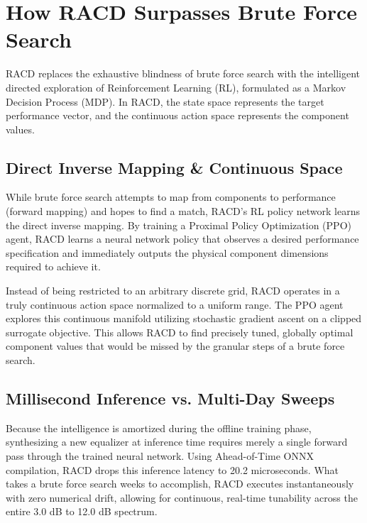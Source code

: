 \documentclass[11pt, a4paper]{article}
\begin{document}
\section{How RACD Surpasses Brute Force Search}
RACD replaces the exhaustive blindness of brute force search with the intelligent directed exploration of Reinforcement Learning (RL), formulated as a Markov Decision Process (MDP). In RACD, the state space represents the target performance vector, and the continuous action space represents the component values.

\subsection*{Direct Inverse Mapping \& Continuous Space}
While brute force search attempts to map from components to performance (forward mapping) and hopes to find a match, RACD's RL policy network learns the direct inverse mapping. By training a Proximal Policy Optimization (PPO) agent, RACD learns a neural network policy that observes a desired performance specification and immediately outputs the physical component dimensions required to achieve it.

Instead of being restricted to an arbitrary discrete grid, RACD operates in a truly continuous action space normalized to a uniform range. The PPO agent explores this continuous manifold utilizing stochastic gradient ascent on a clipped surrogate objective. This allows RACD to find precisely tuned, globally optimal component values that would be missed by the granular steps of a brute force search.

\subsection*{Millisecond Inference vs. Multi-Day Sweeps}
Because the intelligence is amortized during the offline training phase, synthesizing a new equalizer at inference time requires merely a single forward pass through the trained neural network. Using Ahead-of-Time ONNX compilation, RACD drops this inference latency to 20.2 microseconds. What takes a brute force search weeks to accomplish, RACD executes instantaneously with zero numerical drift, allowing for continuous, real-time tunability across the entire 3.0 dB to 12.0 dB spectrum.
\end{document}

